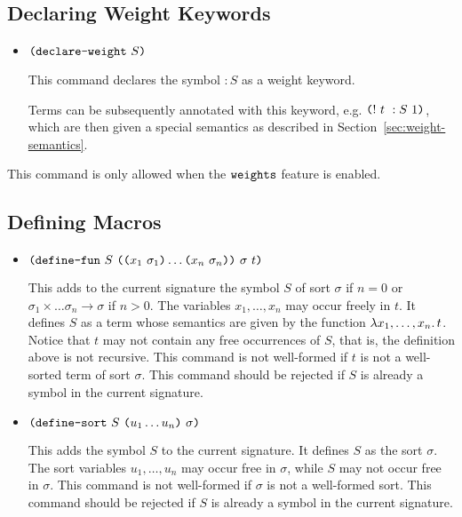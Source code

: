\documentclass[english,a4paper,10pt]{article}
\begin{document}
\subsection{Declaring Weight Keywords}
\label{ssec:declaring-weights}

\begin{itemize}
\item $\texttt{(}\texttt{declare-weight}\mbox{ }S\texttt{)}$

This command declares the symbol $:S$ as a weight keyword.

Terms can be subsequently annotated
with this keyword, e.g. $\texttt{(}!\mbox{ }t\mbox{ }:S\mbox{ }1\texttt{)}$,
which are then given a special semantics as described in Section~\ref{sec:weight-semantics}.

\end{itemize}
This command is only allowed when the $\texttt{weights}$ feature is enabled.

\subsection{Defining Macros}

\begin{itemize}
\item $\texttt{(}\texttt{define-fun}\mbox{ }S\mbox{ }\texttt{(}\texttt{(}x_1\mbox{ }\sigma_1\texttt{)} \ldots \texttt{(}x_n\mbox{ }\sigma_n\texttt{)}\texttt{)}\mbox{ }\sigma\mbox{ }t\texttt{)}$

This adds to the current signature
the symbol $S$ of sort $\sigma$
if $n=0$ or $\sigma_1 \times \ldots \sigma_n \rightarrow \sigma$ if $n>0$.
The variables $x_1, \ldots, x_n$ may occur freely in $t$.
It defines $S$ as a term whose semantics are given by the function
$\lambda x_1, \ldots, x_n \ldotp t$.
Notice that $t$ may not contain any free occurrences of $S$,
that is, the definition above is not recursive.
This command is not well-formed if $t$ is not a well-sorted
term of sort $\sigma$.
This command should be rejected if $S$ is already
a symbol in the current signature.

\item $\texttt{(}\texttt{define-sort}\mbox{ }S\mbox{ }\texttt{(}u_1 \ldots u_n\texttt{)}\mbox{ }\sigma\texttt{)}$

This adds the symbol $S$ to the current signature.
It defines $S$ as the sort $\sigma$.
The sort variables $u_1, \ldots, u_n$
may occur free in $\sigma$,
while $S$ may not occur free in $\sigma$.
This command is not well-formed if $\sigma$
is not a well-formed sort.
This command should be rejected if $S$ is already
a symbol in the current signature.

\end{itemize}
\end{document}
